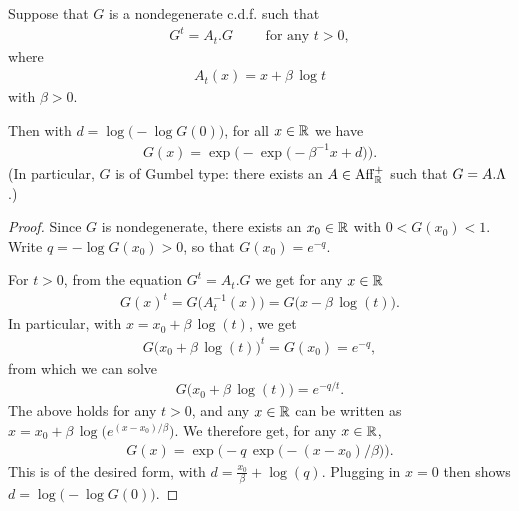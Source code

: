 \begin{lemma}[Self-similar continuous c.d.f. family characterization $\gamma = 0$]
  \label{lem:characterization-self-similar-family-zero-index}
  \leanok
  Suppose that $G$ is a nondegenerate c.d.f. such that
  \begin{align*}
    G^{t} = A_t . G \qquad \text{ for any } t > 0 ,
  \end{align*}
  where
  \begin{align*}
    A_t(x) = x + \beta \, \log t
  \end{align*}
  with $\beta > 0$.

  Then with $d = \log \big(-\log G(0) \big)$,
  for all $x \in \mathbb{R}$ we have
  \begin{align*}
    G(x) = \exp \Big( - \exp \big( -\beta^{-1} x + d \big) \Big) .
  \end{align*}
  (In particular, $G$ is of Gumbel type: there exists an $A \in \mathrm{Aff}^+_{\mathbb{R}}$
  such that $G = A.\Lambda$.)
\end{lemma}
\begin{proof}

  Since $G$ is nondegenerate, there exists an $x_0 \in \mathbb{R}$
  with $0 < G(x_0) < 1$. Write $q = -\log G(x_0) > 0$,
  so that $G(x_0) = e^{-q}$.

  For $t > 0$, from the equation $G^{t} = A_t . G$
  we get for any $x \in \mathbb{R}$
  \begin{align*}
  G(x)^t = G \big( A_t^{-1}(x) \big) = G \big( x - \beta \, \log(t) \big) .
  \end{align*}
  In particular, with $x = x_0 + \beta \, \log(t)$, we get
  \begin{align*}
    G\big( x_0 + \beta \, \log(t) \big)^{t} = G(x_0) = e^{- q},
  \end{align*}
  from which we can solve
  \begin{align*}
    G\big( x_0 + \beta \, \log(t) \big) = e^{-q/t} .
  \end{align*}
  The above holds for any $t>0$, and any $x \in \mathbb{R}$
  can be written as $x = x_0 + \beta \, \log\big( e^{(x - x_0)/\beta} \big)$.
  We therefore get, for any $x \in \mathbb{R}$,
  \begin{align*}
    G(x) = \exp \Big( - q \, \exp \big( -(x-x_0)/\beta \big) \Big) .
  \end{align*}
  This is of the desired form, with $d = \frac{x_0}{\beta} + \log(q)$.
  Plugging in $x = 0$ then shows $d = \log \big(-\log G(0) \big)$.
\end{proof}

